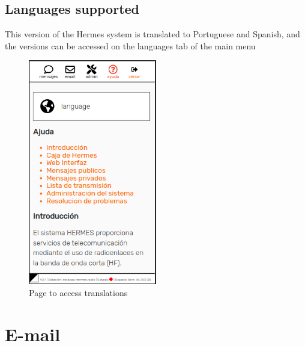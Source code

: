 \documentclass[11pt,a4paper]{article}
\begin{document}
\subsection{Languages supported}
\label{langs}

This version of the Hermes system is translated to Portuguese and Spanish, and the versions can be accessed on the languages tab of the main menu

\begin{figure}[H]
    \centering
    \includegraphics[width=0.5\textwidth]{screenshots/frontend/es/languages.png}
    \caption{Page to access translations}
	\vspace{-10pt}
    \label{fig:languages}
\end{figure}


\section{E-mail}
\label{email}
\end{document}
